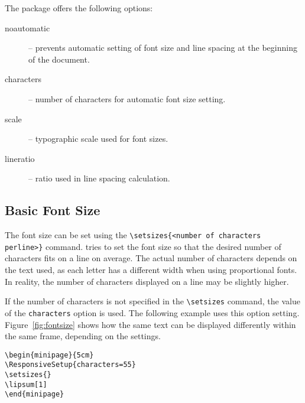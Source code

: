 \documentclass{ltugboat}
\begin{document}
The  package offers the following options:

\begin{description}
  \item[noautomatic] – prevents automatic setting of font size and line spacing at the beginning of the document.
  \item[characters] – number of characters for automatic font size setting.
  \item[scale] – typographic scale used for font sizes.
  \item[lineratio] – ratio used in line spacing calculation.
\end{description}

\subsection{Basic Font Size}

The font size can be set using the \verb|\setsizes{<number of characters per|\allowbreak\verb|line>}| 
command.  tries to set the font
size so that the desired number of characters fits on a line on average. The
actual number of characters depends on the text used, as each letter has a
different width when using proportional fonts. In reality, the number of
characters displayed on a line may be slightly higher.

If the number of characters is not specified in the \verb|\setsizes| command,
the value of the \texttt{characters} option is used. The following example uses
this option setting. Figure~\ref{fig:fontsize} shows how the same text can be
displayed differently within the same frame, depending on the settings.

\begin{verbatim}
\begin{minipage}{5cm}
\ResponsiveSetup{characters=55}
\setsizes{}
\lipsum[1]
\end{minipage}
\end{verbatim}
\end{document}
